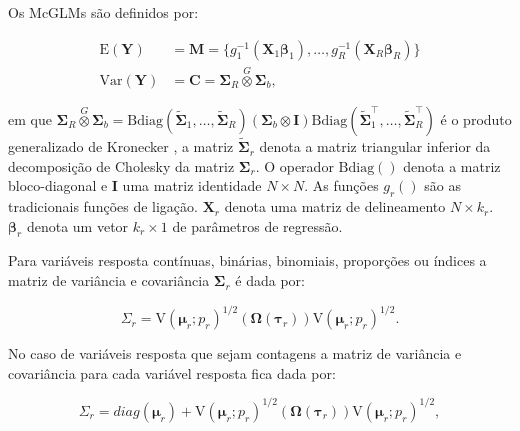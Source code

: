 \documentclass[AMA,STIX1COL]{WileyNJD-v2}
\begin{document}
Os McGLMs \citep{Bonat16}são definidos por:

\begin{equation}
\label{eq:mcglm}
      \begin{aligned}
        \mathrm{E}(\boldsymbol{Y}) &=
          \boldsymbol{M} =
            \{g_1^{-1}(\boldsymbol{X}_1 \boldsymbol{\beta}_1),
            \ldots,
            g_R^{-1}(\boldsymbol{X}_R \boldsymbol{\beta}_R)\}
          \\
        \mathrm{Var}(\boldsymbol{Y}) &=
          \boldsymbol{C} =
            \boldsymbol{\Sigma}_R \overset{G} \otimes
            \boldsymbol{\Sigma}_b,
      \end{aligned}
\end{equation}

\noindent em que $\boldsymbol{\Sigma}_R \overset{G} \otimes \boldsymbol{\Sigma}_b = \mathrm{Bdiag}(\tilde{\boldsymbol{\Sigma}}_1, \ldots, \tilde{\boldsymbol{\Sigma}}_R) (\boldsymbol{\Sigma}_b \otimes \boldsymbol{I}) \mathrm{Bdiag}(\tilde{\boldsymbol{\Sigma}}_1^\top, \ldots, \tilde{\boldsymbol{\Sigma}}_R^\top)$ é o produto generalizado de Kronecker \citet{martinez13}, a matriz $\tilde{\boldsymbol{\Sigma}}_r$ denota a matriz triangular inferior da decomposição de Cholesky da matriz ${\boldsymbol{\Sigma}}_r$. O operador $\mathrm{Bdiag()}$ denota a matriz bloco-diagonal e $\boldsymbol{I}$ uma matriz identidade $N \times N$. As funções $g_r()$ são as tradicionais funções de ligação. $\boldsymbol{X}_r$ denota uma matriz de delineamento $N \times k_r$. $\boldsymbol{\beta}_r$ denota um vetor $k_r \times 1$ de parâmetros de regressão.

Para variáveis resposta contínuas, binárias, binomiais, proporções ou índices a matriz de variância e covariância $\boldsymbol{\Sigma}_r$ é dada por:

\begin{equation}
\Sigma_r =
\mathrm{V}\left(\boldsymbol{\mu}_r; p_r\right)^{1/2}(\boldsymbol{\Omega}\left(\boldsymbol{\tau}_r\right))\mathrm{V}\left(\boldsymbol{\mu}_r; p_r\right)^{1/2}.
\end{equation}

No caso de variáveis resposta que sejam contagens a matriz de variância e covariância para cada variável resposta fica dada por:

\begin{equation}
\Sigma_r = diag(\boldsymbol{\mu}_r)+ \mathrm{V}\left(\boldsymbol{\mu}_r; p_r\right)^{1/2}(\boldsymbol{\Omega}\left(\boldsymbol{\tau}_r\right))\mathrm{V}\left(\boldsymbol{\mu}_r; p_r\right)^{1/2},
\end{equation}
\end{document}
